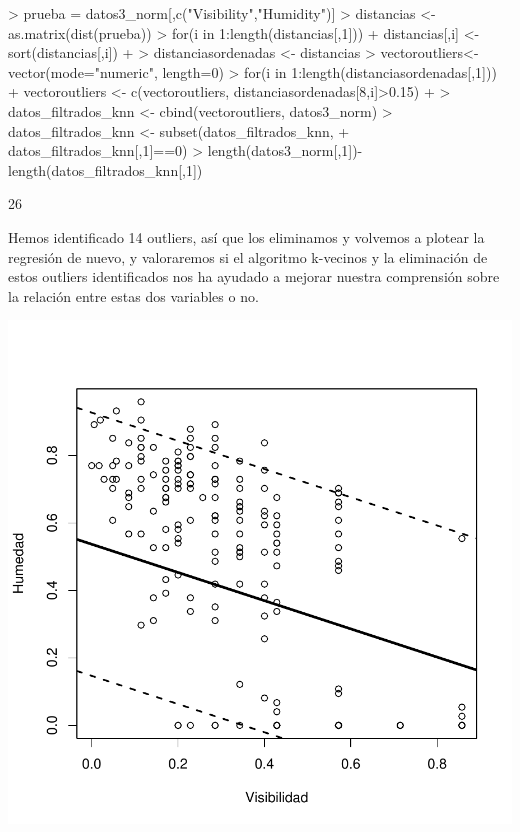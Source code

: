 \documentclass [a4paper] {article}
\begin{document}
\begin{Schunk}
\begin{Sinput}
> prueba = datos3_norm[,c("Visibility","Humidity")]
> distancias <- as.matrix(dist(prueba))
> for(i in 1:length(distancias[,1])){
+ distancias[,i] <- sort(distancias[,i])
+ }
> distanciasordenadas <- distancias
> vectoroutliers<- vector(mode="numeric", length=0)
> for(i in 1:length(distanciasordenadas[,1])){
+   vectoroutliers <- c(vectoroutliers, distanciasordenadas[8,i]>0.15)
+ }
> datos_filtrados_knn <- cbind(vectoroutliers, datos3_norm)
> datos_filtrados_knn <- subset(datos_filtrados_knn,
+   datos_filtrados_knn[,1]==0)
> length(datos3_norm[,1])-length(datos_filtrados_knn[,1])
\end{Sinput}
\begin{Soutput}
[1] 26
\end{Soutput}
\end{Schunk}

Hemos identificado 14 outliers, así que los eliminamos y volvemos a plotear la regresión de nuevo, y valoraremos si el algoritmo k-vecinos y la eliminación 
de estos outliers identificados nos ha ayudado a mejorar nuestra comprensión sobre la relación entre estas dos variables o no.

\begin{center}
\includegraphics{entrega-analisissinoutlierskvecinos}
\end{center}
\end{document}
